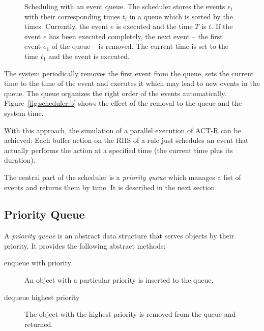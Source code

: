 \begin{figure}[hbt]
{
\label{fig:scheduler:b}}
\caption{Scheduling with an event queue.  The scheduler stores the events $e_i$ with their corresponding times $t_i$ in a queue which is sorted by the times. Currently, the event $e$ is executed and the time $T$ is $t$.  If the event $e$ has been executed completely, the next event -- the first event $e_1$ of the queue -- is removed. The current time is set to the time $t_1$ and the event is executed.}
\label{fig:scheduler}
\end{figure}

The system periodically removes the first event from the queue, sets the current time to the time of the event and executes it which may lead to new events in the queue. The queue organizes the right order of the events automatically. Figure~\ref{fig:scheduler:b} shows the effect of the removal to the queue and the system time.

With this approach, the simulation of a parallel execution of ACT-R can be achieved: Each buffer action on the RHS of a rule just schedules an event that actually performs the action at a specified time (the current time plus its duration). 

The central part of the scheduler is a \emph{priority queue} which manages a list of events and returns them by time. It is described in the next section.

\subsection{Priority Queue}

A \emph{priority queue} is an abstract data structure that serves objects by their priority. It provides the following abstract methods:

\begin{description}
 \item[enqueue with priority] An object with a particular priority is inserted to the queue. 
 \item[dequeue highest priority] The object with the highest priority is removed from the queue and returned.
\end{description}

